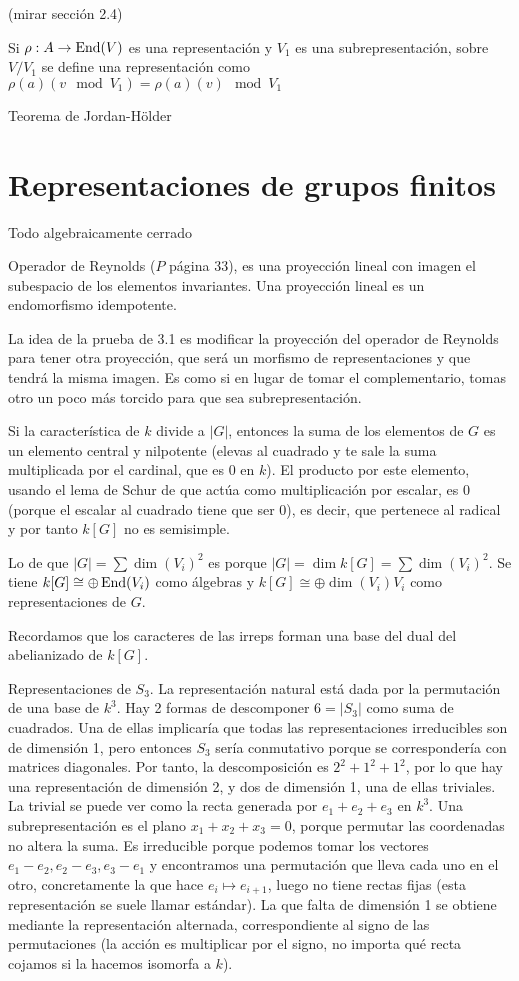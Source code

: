 \documentclass[ANAyTR.tex]{subfiles}
\begin{document}
 (mirar sección 2.4)
 
 Si $\rho:A\to\operatorname{End}(V)$ es una representación y $V_1$ es una subrepresentación, sobre $V/V_1$ se define una representación como $\rho(a)(v\mod V_1)=\rho(a)(v)\mod V_1$
 
 Teorema de Jordan-Hölder
 
 \section{Representaciones de grupos finitos}
 Todo algebraicamente cerrado 
 
 Operador de Reynolds ($P$ página 33), es una proyección lineal con imagen el subespacio de los elementos invariantes. Una proyección lineal es un endomorfismo idempotente. 
 
 La idea de la prueba de 3.1 es modificar la proyección del operador de Reynolds para tener otra proyección, que será un morfismo de representaciones y que tendrá la misma imagen. Es como si en lugar de tomar el complementario, tomas otro un poco más torcido para que sea subrepresentación.
 
 Si la característica de $k$ divide a $|G|$, entonces la suma de los elementos de $G$ es un elemento central y nilpotente (elevas al cuadrado y te sale la suma multiplicada por el cardinal, que es 0 en $k$). El producto por este elemento, usando el lema de Schur de que actúa como multiplicación por escalar, es 0 (porque el escalar al cuadrado tiene que ser 0), es decir, que pertenece al radical y por tanto $k[G]$ no es semisimple. 
 
 Lo de que $|G|=\sum \dim(V_i)^2$ es porque $|G|=\dim k[G]=\sum\dim(V_i)^2$. Se tiene $k[G]\cong \oplus\operatorname{End}(V_i)$ como álgebras y $k[G]\cong\oplus\dim(V_i)V_i$ como representaciones de $G$. 
 
 Recordamos que los caracteres de las irreps forman una base del dual del abelianizado de $k[G]$. 
 
 \begin{ej}
 
 Representaciones de $S_3$. La representación natural está dada por la permutación de una base de $k^3$. Hay 2 formas de descomponer $6=|S_3|$ como suma de cuadrados. Una de ellas implicaría que todas las representaciones irreducibles son de dimensión 1, pero entonces $S_3$ sería conmutativo porque se correspondería con matrices diagonales. Por tanto, la descomposición es $2^2+1^2+1^2$, por lo que hay una representación de dimensión 2, y dos de dimensión 1, una de ellas triviales. La trivial se puede ver como la recta generada por $e_1+e_2+e_3$ en $k^3$. Una subrepresentación es el plano $x_1+x_2+x_3=0$, porque permutar las coordenadas no altera la suma. Es irreducible porque podemos tomar los vectores $e_1-e_2, e_2-e_3,e_3-e_1$ y encontramos una permutación que lleva cada uno en el otro, concretamente la que hace $e_i\mapsto e_{i+1}$, luego no tiene rectas fijas (esta representación se suele llamar estándar). La que falta de dimensión 1 se obtiene mediante la representación alternada, correspondiente al signo de las permutaciones (la acción es multiplicar por el signo, no importa qué recta cojamos si la hacemos isomorfa a $k$).
 \end{ej}
 
\end{document}
